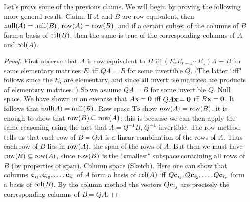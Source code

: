 \begin{frame}
Let's prove some of the previous claims. We will begin by proving the following more general result.
\bspace
\alert{Claim}. If $A$ and $B$ are \alert{row equivalent}, then $\operatorname{null}(A)=\operatorname{null}(B)$, $\operatorname{row}(A)=\operatorname{row}(B)$, and if a certain subset of the columns of $B$ form a basis of $\operatorname{col}(B)$, then the same is true of the corresponding columns of $A$ and $\operatorname{col}(A)$. 
\pause
\begin{proof}
First observe that $A$ is row equivalent to $B$ iff $(E_rE_{r-1}\cdots E_1)A=B$ for some elementary matrices $E_i$ iff $QA=B$ for some invertible $Q$. (The latter ``iff" follows since the $E_i$ are elementary, and since all invertible matrices are products of elementary matrices. )
\pause
So we assume $QA=B$ for some invertible $Q$. 
\bpause 
\alert{Null space}. We have shown in an exercise that $A{\mathbf x}={\mathbf 0}$ iff $QA{\mathbf x}={\mathbf 0}$ iff $B{\mathbf x}={\mathbf 0}$. It follows that $\operatorname{null}(A)=\operatorname{null}(B)$. 
\bpause
\alert{Row space}
To show $\operatorname{row}(A)=\operatorname{row}(B)$, it is enough to show that $\operatorname{row}(B)\subseteq \operatorname{row}(A)$; this is because we can then apply the same reasoning using the fact that $A=Q^{-1}B$, $Q^{-1}$ invertible. \pause The row method tells us that each row of $B=QA$ is a linear combination of the rows of $A$. Thus each row of $B$ lies in $\operatorname{row}(A)$, the span of the rows of $A$. \pause But then we must have $\operatorname{row}(B)\subseteq\operatorname{row}(A)$, since $\operatorname{row}(B)$ is the ``smallest" subspace containing all rows of $B$ (by properties of span).
\bpause
\alert{Column space} (Sketch). Here one can show that columns ${\mathbf c}_{i_1}, {\mathbf c}_{i_2},\dots, {\mathbf c}_{i_r}$ of $A$ form a basis of $\operatorname{col}(A)$ iff $Q{\mathbf c}_{i_1}, Q{\mathbf c}_{i_2},\dots, Q{\mathbf c}_{i_r}$ form a basis of $\operatorname{col}(B)$. By the column method the vectors $Q{\mathbf c}_{i_j}$ are precisely the corresponding columns of $B=QA$. 
\end{proof}

\end{frame}
